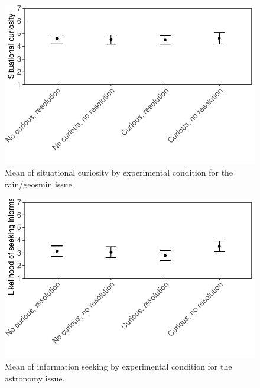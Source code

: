 \documentclass[
  letterpaper,
  DIV=11,
  numbers=noendperiod]{scrartcl}
\begin{document}
\begin{figure}

{\centering \includegraphics{curiosity_student-pilot_data-analysis_files/figure-pdf/fig-rsitcur-1.pdf}

}

\caption{\label{fig-rsitcur}Mean of situational curiosity by
experimental condition for the rain/geosmin issue.}

\end{figure}

\begin{figure}

{\centering \includegraphics{curiosity_student-pilot_data-analysis_files/figure-pdf/fig-ainfoseek-1.pdf}

}

\caption{\label{fig-ainfoseek}Mean of information seeking by
experimental condition for the astronomy issue.}

\end{figure}
\end{document}
